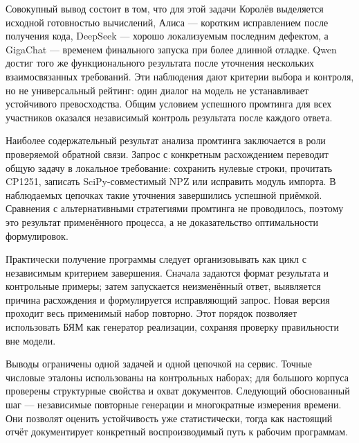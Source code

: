 Совокупный вывод состоит в том, что для этой задачи Королёв выделяется исходной готовностью вычислений, Алиса — коротким исправлением после получения кода, DeepSeek — хорошо локализуемым последним дефектом, а GigaChat — временем финального запуска при более длинной отладке. Qwen достиг того же функционального результата после уточнения нескольких взаимосвязанных требований. Эти наблюдения дают критерии выбора и контроля, но не универсальный рейтинг: один диалог на модель не устанавливает устойчивого превосходства. Общим условием успешного промтинга для всех участников оказался независимый контроль результата после каждого ответа.

Наиболее содержательный результат анализа промтинга заключается в роли проверяемой обратной связи. Запрос с конкретным расхождением переводит общую задачу в локальное требование: сохранить нулевые строки, прочитать CP1251, записать SciPy-совместимый NPZ или исправить модуль импорта. В наблюдаемых цепочках такие уточнения завершились успешной приёмкой. Сравнения с альтернативными стратегиями промтинга не проводилось, поэтому это результат применённого процесса, а не доказательство оптимальности формулировок.

Практически получение программы следует организовывать как цикл с независимым критерием завершения. Сначала задаются формат результата и контрольные примеры; затем запускается неизменённый ответ, выявляется причина расхождения и формулируется исправляющий запрос. Новая версия проходит весь применимый набор повторно. Этот порядок позволяет использовать БЯМ как генератор реализации, сохраняя проверку правильности вне модели.

Выводы ограничены одной задачей и одной цепочкой на сервис. Точные числовые эталоны использованы на контрольных наборах; для большого корпуса проверены структурные свойства и охват документов. Следующий обоснованный шаг — независимые повторные генерации и многократные измерения времени. Они позволят оценить устойчивость уже статистически, тогда как настоящий отчёт документирует конкретный воспроизводимый путь к рабочим программам.


